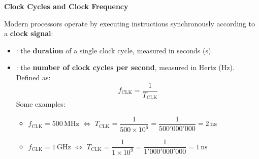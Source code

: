 \begin{flushleft}
  \textcolor{Green3}{ \textbf{Clock Cycles and Clock Frequency}}
\end{flushleft}
Modern processors operate by executing instructions synchronously according to a \textbf{clock signal}:
\begin{itemize}
  \item {}: the \textbf{duration} of a single clock cycle, measured in seconds (s).

  \item {}: the \textbf{number of clock cycles per second}, measured in Hertz (Hz). Defined as:
  \begin{equation}
    f_{\text{CLK}} = \dfrac{1}{T_{\text{CLK}}}
  \end{equation}
  Some examples:
  \begin{itemize}
    \item $f_{\text{CLK}} = 500\, \text{MHz}$ $\Leftrightarrow$ $T_{\text{CLK}} = \dfrac{1}{500 \times 10^{6}} = \dfrac{1}{500'000'000} = 2\, \text{ns}$
    \item $f_{\text{CLK}} = 1\, \text{GHz}$ $\Leftrightarrow$ $T_{\text{CLK}} = \dfrac{1}{1 \times 10^{9}} = \dfrac{1}{1'000'000'000} = 1\, \text{ns}$
  \end{itemize}
\end{itemize}


